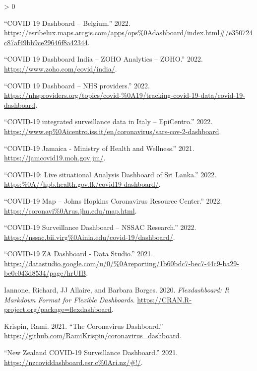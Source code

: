 \documentclass[
]{article}
\newlength{\cslhangindent}
\newenvironment{CSLReferences}[2] %
 {%
  \setlength{\parindent}{0pt}
  \ifodd #1 \everypar{\setlength{\hangindent}{\cslhangindent}}\ignorespaces\fi
  \ifnum #2 > 0
  \setlength{\parskip}{#2\baselineskip}
  \fi
 }%
 {}
\begin{document}
\hypertarget{refs}{}
\begin{CSLReferences}{1}{0}
\leavevmode\hypertarget{ref-belgium}{}%
{``{COVID 19 Dashboard -- Belgium}.''} 2022.
\url{https://esribelux.maps.arcgis.com/apps/ops\%0Adashboard/index.html\#/e350724c87af49bb9ce29646f8a42344}.

\leavevmode\hypertarget{ref-indiadash}{}%
{``{COVID 19 Dashboard India -- ZOHO Analytics -- ZOHO}.''} 2022.
\url{https://www.zoho.com/covid/india/}.

\leavevmode\hypertarget{ref-nhs}{}%
{``{COVID 19 Dashboard -- NHS providers}.''} 2022.
\url{https://nhsproviders.org/topics/covid-\%0A19/tracking-covid-19-data/covid-19-dashboard}.

\leavevmode\hypertarget{ref-italy}{}%
{``{COVID-19 integrated surveillance data in Italy -- EpiCentro}.''}
2022.
\url{https://www.ep\%0Aicentro.iss.it/en/coronavirus/sars-cov-2-dashboard}.

\leavevmode\hypertarget{ref-jamaica}{}%
{``{COVID-19 Jamaica - Ministry of Health and Wellness}.''} 2021.
\url{https://jamcovid19.moh.gov.jm/}.

\leavevmode\hypertarget{ref-sl}{}%
{``{COVID-19: Live situational Analysis Dashboard of Sri Lanka}.''}
2022. \url{https:\%0A//hpb.health.gov.lk/covid19-dashboard/}.

\leavevmode\hypertarget{ref-jh}{}%
{``{COVID-19 Map -- Johns Hopkins Coronavirus Resource Center}.''} 2022.
\url{https://coronavi\%0Arus.jhu.edu/map.html}.

\leavevmode\hypertarget{ref-nssac}{}%
{``{COVID-19 Surveillance Dashboard -- NSSAC Research}.''} 2022.
\url{https://nssac.bii.virg\%0Ainia.edu/covid-19/dashboard/}.

\leavevmode\hypertarget{ref-za}{}%
{``{COVID-19 ZA Dashboard - Data Studio}.''} 2021.
\url{https://datastudio.google.com/u/0/\%0Areporting/1b60bdc7-bec7-44c9-ba29-be0e043d8534/page/hrUIB}.

\leavevmode\hypertarget{ref-flexdashboard}{}%
Iannone, Richard, JJ Allaire, and Barbara Borges. 2020.
\emph{Flexdashboard: R Markdown Format for Flexible Dashboards}.
\url{https://CRAN.R-project.org/package=flexdashboard}.

\leavevmode\hypertarget{ref-rami}{}%
Krispin, Rami. 2021. {``{The Coronavirus Dashboard}.''}
\url{https://github.com/RamiKrispin/coronavirus_dashboard}.

\leavevmode\hypertarget{ref-nz}{}%
{``{New Zealand COVID-19 Surveillance Dashboard}.''} 2021.
\url{https://nzcoviddashboard.esr.c\%0Ari.nz/\#!/}.


\end{CSLReferences}
\end{document}
